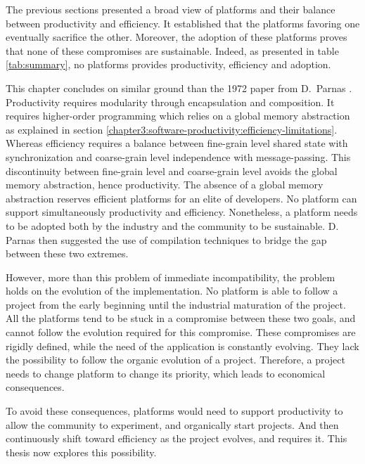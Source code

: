 The previous sections presented a broad view of platforms and their balance between productivity and efficiency.
It established that the platforms favoring one eventually sacrifice the other.
Moreover, the adoption of these platforms proves that none of these compromises are sustainable.
Indeed, as presented in table \ref{tab:summary}, no platforms provides productivity, efficiency and adoption.


\separator

This chapter concludes on similar ground than the 1972 paper from D.~Parnas \cite{Parnas1972}.
Productivity requires modularity through encapsulation and composition.
It requires higher-order programming which relies on a global memory abstraction as explained in section \ref{chapter3:software-productivity:efficiency-limitations}.
Whereas efficiency requires a balance between fine-grain level shared state with synchronization and coarse-grain level independence with message-passing.
This discontinuity between fine-grain level and coarse-grain level avoids the global memory abstraction, hence productivity.
The absence of a global memory abstraction reserves efficient platforms for an elite of developers.
No platform can support simultaneously productivity and efficiency.
Nonetheless, a platform needs to be adopted both by the industry and the community to be sustainable.
D. Parnas then suggested the use of compilation techniques to bridge the gap between these two extremes.

However, more than this problem of immediate incompatibility, the problem holds on the evolution of the implementation.
No platform is able to follow a project from the early beginning until the industrial maturation of the project.
All the platforms tend to be stuck in a compromise between these two goals, and cannot follow the evolution required for this compromise.
These compromises are rigidly defined, while the need of the application is constantly evolving.
They lack the possibility to follow the organic evolution of a project.
Therefore, a project needs to change platform to change its priority, which leads to economical consequences.

To avoid these consequences, platforms would need to support productivity to allow the community to experiment, and organically start projects.
And then continuously shift toward efficiency as the project evolves, and requires it.
This thesis now explores this possibility.

                                    \endinput


